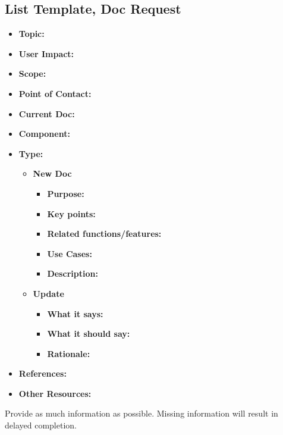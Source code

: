 \documentclass[a4paper]{article}
\begin{document}
\clearpage

\subsection*{List Template, Doc Request}
\begin{itemize}
	\item \textbf{Topic:}
	\item \textbf{User Impact:}
	\item \textbf{Scope:}
	\item \textbf{Point of Contact:}
	\item \textbf{Current Doc:}
	\item \textbf{Component:}
	\item \textbf{Type:}
	\begin{itemize}
		\item \textbf{New Doc}
		\begin{itemize}
			\item \textbf{Purpose:}
			\item \textbf{Key points:}
			\item \textbf{Related functions/features:}
			\item \textbf{Use Cases:}
			\item \textbf{Description:}
		\end{itemize}
		\item \textbf{Update}
		\begin{itemize}
			\item \textbf{What it says:}
			\item \textbf{What it should say:}
			\item \textbf{Rationale:}
		\end{itemize}
	\end{itemize}
	\item \textbf{References:}
	\item \textbf{Other Resources:}
\end{itemize}

Provide as much information as possible. Missing information will result in delayed completion.
\end{document}

